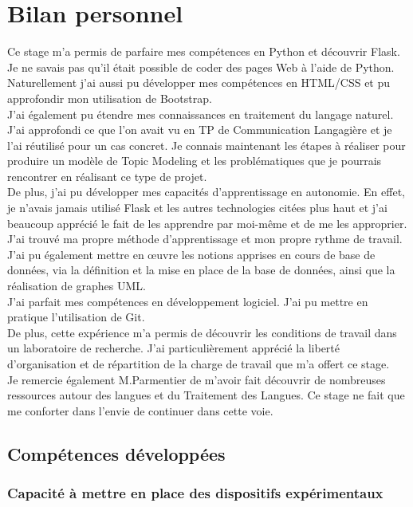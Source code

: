\documentclass[12pt]{article}
\begin{document}
\section{Bilan personnel}


Ce stage m’a permis de parfaire mes compétences en Python et découvrir Flask. Je ne savais pas qu’il était possible de coder des pages Web à l’aide de Python. Naturellement j’ai aussi pu développer mes compétences en HTML/CSS et pu approfondir mon utilisation de Bootstrap. \\
J'ai également pu étendre mes connaissances en traitement du langage naturel. J'ai approfondi ce que l'on avait vu en TP de Communication Langagière et je l'ai réutilisé pour un cas concret. Je connais maintenant les étapes à réaliser pour produire un modèle de Topic Modeling et les problématiques que je pourrais rencontrer en réalisant ce type de projet. \\
De plus, j'ai pu développer mes capacités d'apprentissage en autonomie. En effet, je n'avais jamais utilisé Flask et les autres technologies citées plus haut et j'ai beaucoup apprécié le fait de les apprendre par moi-même et de me les approprier. J'ai trouvé ma propre méthode d'apprentissage et mon propre rythme de travail. \\
J’ai pu également mettre en œuvre les notions apprises en cours de base de données, via la définition et la mise en place de la base de données, ainsi que la réalisation de graphes UML. \\
J'ai parfait mes compétences en développement logiciel. J'ai pu mettre en pratique l'utilisation de Git. \\
De plus, cette expérience m’a permis de découvrir les conditions de travail dans un laboratoire de recherche. J’ai particulièrement apprécié la liberté d’organisation et de répartition de la charge de travail que m’a offert ce stage. \\

Je remercie également M.Parmentier de m'avoir fait découvrir de  nombreuses ressources autour des langues et du Traitement des Langues. Ce stage ne fait que me conforter dans l'envie de continuer dans cette voie. 

\subsection{Compétences développées}

\subsubsection{Capacité à mettre en place des dispositifs expérimentaux  }
\end{document}
